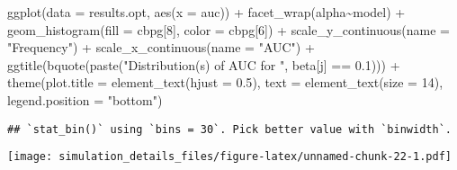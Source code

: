 \documentclass[
]{article}
\newenvironment{Shaded}{\begin{snugshade}}{\end{snugshade}}
\newcommand{\AttributeTok}[1]{\textcolor[rgb]{0.77,0.63,0.00}{#1}}
\newcommand{\DecValTok}[1]{\textcolor[rgb]{0.00,0.00,0.81}{#1}}
\newcommand{\FloatTok}[1]{\textcolor[rgb]{0.00,0.00,0.81}{#1}}
\newcommand{\FunctionTok}[1]{\textcolor[rgb]{0.00,0.00,0.00}{#1}}
\newcommand{\NormalTok}[1]{#1}
\newcommand{\SpecialCharTok}[1]{\textcolor[rgb]{0.00,0.00,0.00}{#1}}
\newcommand{\StringTok}[1]{\textcolor[rgb]{0.31,0.60,0.02}{#1}}
\begin{document}
\begin{Shaded}
\begin{Highlighting}[]
\FunctionTok{ggplot}\NormalTok{(}\AttributeTok{data =}\NormalTok{ results.opt,}
       \FunctionTok{aes}\NormalTok{(}\AttributeTok{x =}\NormalTok{ auc)) }\SpecialCharTok{+}
  \FunctionTok{facet\_wrap}\NormalTok{(alpha}\SpecialCharTok{\textasciitilde{}}\NormalTok{model) }\SpecialCharTok{+}
  \FunctionTok{geom\_histogram}\NormalTok{(}\AttributeTok{fill =}\NormalTok{ cbpg[}\DecValTok{8}\NormalTok{], }\AttributeTok{color =}\NormalTok{ cbpg[}\DecValTok{6}\NormalTok{]) }\SpecialCharTok{+}
  \FunctionTok{scale\_y\_continuous}\NormalTok{(}\AttributeTok{name =} \StringTok{"Frequency"}\NormalTok{) }\SpecialCharTok{+}
  \FunctionTok{scale\_x\_continuous}\NormalTok{(}\AttributeTok{name =} \StringTok{"AUC"}\NormalTok{) }\SpecialCharTok{+}
  \FunctionTok{ggtitle}\NormalTok{(}\FunctionTok{bquote}\NormalTok{(}\FunctionTok{paste}\NormalTok{(}\StringTok{"Distribution(s) of AUC for "}\NormalTok{, beta[j] }\SpecialCharTok{==} \FloatTok{0.1}\NormalTok{))) }\SpecialCharTok{+}
  \FunctionTok{theme}\NormalTok{(}\AttributeTok{plot.title =} \FunctionTok{element\_text}\NormalTok{(}\AttributeTok{hjust =} \FloatTok{0.5}\NormalTok{), }
        \AttributeTok{text =} \FunctionTok{element\_text}\NormalTok{(}\AttributeTok{size =} \DecValTok{14}\NormalTok{),}
        \AttributeTok{legend.position =} \StringTok{"bottom"}\NormalTok{)}
\end{Highlighting}
\end{Shaded}

\begin{verbatim}
## `stat_bin()` using `bins = 30`. Pick better value with `binwidth`.
\end{verbatim}

\texttt{[image: simulation\_details\_files/figure-latex/unnamed-chunk-22-1.pdf]}
\end{document}
